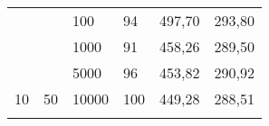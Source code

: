 \documentclass{article}
\begin{document}
\begin{table}[h]
\begin{tabular}{llllll}
			&                                                                       &                                                                           &                                                                              &                                                                                     &                                                                                       \\ \hline
			\multicolumn{1}{|l|}{}                                                 & \multicolumn{1}{l|}{}                                                 & \multicolumn{1}{l|}{100}                                                  & \multicolumn{1}{l|}{94}                                                      & \multicolumn{1}{l|}{497,70}                                                         & \multicolumn{1}{l|}{293,80}                                                           \\ \cline{3-6} 
			\multicolumn{1}{|l|}{}                                                 & \multicolumn{1}{l|}{}                                                 & \multicolumn{1}{l|}{1000}                                                 & \multicolumn{1}{l|}{91}                                                      & \multicolumn{1}{l|}{458,26}                                                         & \multicolumn{1}{l|}{289,50}                                                           \\ \cline{3-6} 
			\multicolumn{1}{|l|}{}                                                 & \multicolumn{1}{l|}{}                                                 & \multicolumn{1}{l|}{5000}                                                 & \multicolumn{1}{l|}{96}                                                      & \multicolumn{1}{l|}{453,82}                                                         & \multicolumn{1}{l|}{290,92}                                                           \\ \cline{3-6} 
			\multicolumn{1}{|l|}{\multirow{-4}{*}{10}}                             & \multicolumn{1}{l|}{\multirow{-4}{*}{50}}                             & \multicolumn{1}{l|}{10000}                                                & \multicolumn{1}{l|}{100}                                                     & \multicolumn{1}{l|}{449,28}                                                         & \multicolumn{1}{l|}{288,51}                                                           \\ \hline
			&                                                                       &                                                                           &                                                                              &                                                                                     &                                                                                       \\ \hline

\end{tabular}
\end{table}
\end{document}
